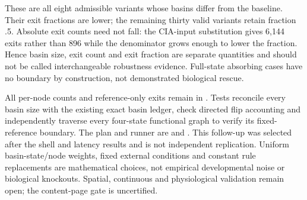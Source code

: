 These are all eight admissible variants whose basins differ from the baseline. Their exit fractions are lower; the remaining thirty valid variants retain fraction .5. Absolute exit counts need not fall: the CIA-input substitution gives 6,144 exits rather than 896 while the denominator grows enough to lower the fraction. Hence basin size, exit count and exit fraction are separate quantities and should not be called interchangeable robustness evidence. Full-state absorbing cases have no boundary by construction, not demonstrated biological rescue.

All per-node counts and reference-only exits remain in . Tests reconcile every basin size with the existing exact basin ledger, check directed flip accounting and independently traverse every four-state functional graph to verify its fixed-reference boundary. The plan and runner are  and . This follow-up was selected after the shell and latency results and is not independent replication. Uniform basin-state/node weights, fixed external conditions and constant rule replacements are mathematical choices, not empirical developmental noise or biological knockouts. Spatial, continuous and physiological validation remain open; the content-page gate is uncertified.


